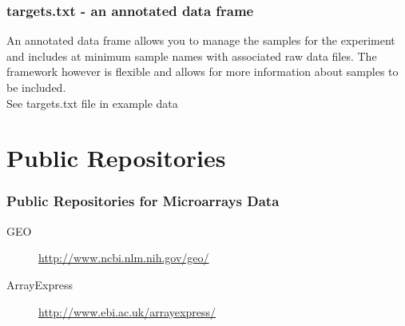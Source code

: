\documentclass[pdf]{beamer}
\begin{document}
\begin{frame}
  \frametitle{targets.txt - an annotated data frame}
  An annotated data frame allows you to manage the samples for the experiment and includes at minimum sample names with associated raw data files. The framework however is flexible and allows for more information about samples to be included.\\


 \alert{See targets.txt file in example data} 
\end{frame}
  
\section{Public Repositories}
\begin{frame}
  \frametitle{Public Repositories for Microarrays Data}
  \begin{description}
    \item[GEO] \href{http://www.ncbi.nlm.nih.gov/geo/}{http://www.ncbi.nlm.nih.gov/geo/}
	\newline
    \item[ArrayExpress] \href{http://www.ebi.ac.uk/arrayexpress/}{http://www.ebi.ac.uk/arrayexpress/}
  \end{description}  
\end{frame}


%
\end{document}
